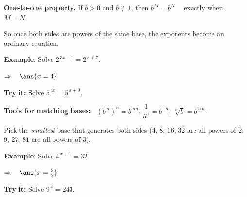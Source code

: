 \documentclass[12pt]{article}
\begin{document}


\begin{formulabox}
\textbf{One-to-one property.} If $b > 0$ and $b \neq 1$, then
$b^{M} = b^{N}$ \ \ exactly when \ \ $M = N$.\par
So once both sides are powers of the same base, the exponents become an ordinary equation.
\end{formulabox}

\begin{examplebox}
\textbf{Example:} \quad Solve $2^{\,3x-1} = 2^{\,x+7}$.

$\Rightarrow\quad \ans{x = 4}$
\end{examplebox}

\begin{tryitbox}
\textbf{Try it:} \quad Solve $5^{\,4x} = 5^{\,x+9}$.\\[2pt]
\end{tryitbox}


\begin{formulabox}
\textbf{Tools for matching bases:} \ $(b^{m})^{n} = b^{mn}$, \quad
$\dfrac{1}{b^{n}} = b^{-n}$, \quad $\sqrt[n]{b} = b^{1/n}$.\par
Pick the \emph{smallest} base that generates both sides ($4$, $8$, $16$, $32$ are all powers of $2$; $9$, $27$, $81$ are all powers of $3$).
\end{formulabox}

\begin{examplebox}
\textbf{Example:} \quad Solve $4^{\,x+1} = 32$.

$\Rightarrow\quad \ans{x = \tfrac{3}{2}}$
\end{examplebox}

\begin{tryitbox}
\textbf{Try it:} \quad Solve $9^{\,x} = 243$.\\[2pt]
\end{tryitbox}
\end{document}
